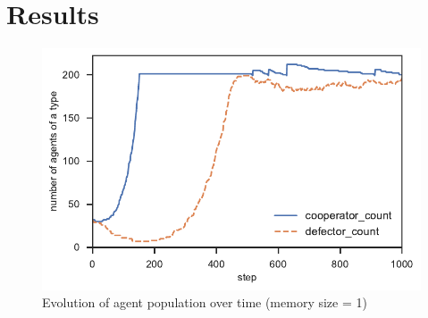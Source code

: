 \documentclass[english]{article}
\begin{document}
\section{Results}


\begin{figure}[h!]
  \centering
  \includegraphics{frequency_time_with_memory.pdf}
  \caption{Evolution of agent population over time (memory size = 1)}
  \label{table:population_evolution}
\end{figure}
\end{document}
